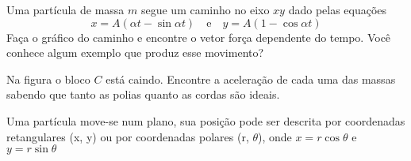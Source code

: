 \documentclass[]{IMTexam}
\begin{document}
\begin{questions}
	\question Uma partícula de massa $ m $ segue um caminho no eixo $ xy $ dado pelas equações \[ x = A(\alpha t- \sin \alpha t)\quad\text{e}\quad y = A(1 - \cos \alpha t) \]
	Faça o gráfico do caminho e encontre o vetor força dependente do tempo. Você conhece algum exemplo que produz esse movimento?

	\begin{solution}

	\end{solution}

	\question Na figura o bloco $ C $ está caindo. Encontre a aceleração de cada uma das massas sabendo que tanto as polias quanto as cordas são ideais.

	\begin{solution}

	\end{solution}

	\question Uma partícula move-se num plano, sua posição pode ser descrita por coordenadas retangulares (x, y) ou por coordenadas polares (r, $\theta$), onde $x = r \cos \theta$ e $y = r \sin \theta$

\end{questions}
\end{document}

